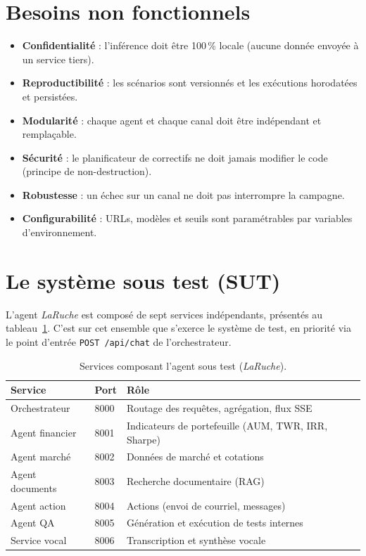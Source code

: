 \documentclass[12pt,a4paper,oneside]{report}
\newcommand{\sut}{\textit{LaRuche}}
\begin{document}
\section{Besoins non fonctionnels}
\begin{itemize}[leftmargin=*]
  \item \textbf{Confidentialité} : l'inférence doit être 100\,\% locale (aucune donnée
  envoyée à un service tiers).
  \item \textbf{Reproductibilité} : les scénarios sont versionnés et les exécutions
  horodatées et persistées.
  \item \textbf{Modularité} : chaque agent et chaque canal doit être indépendant et
  remplaçable.
  \item \textbf{Sécurité} : le planificateur de correctifs ne doit jamais modifier le
  code (principe de non-destruction).
  \item \textbf{Robustesse} : un échec sur un canal ne doit pas interrompre la
  campagne.
  \item \textbf{Configurabilité} : URLs, modèles et seuils sont paramétrables par
  variables d'environnement.
\end{itemize}

\section{Le système sous test (SUT)}
L'agent \sut{} est composé de sept services indépendants, présentés au
tableau~\ref{tab:services}. C'est sur cet ensemble que s'exerce le système de test, en
priorité via le point d'entrée \texttt{POST /api/chat} de l'orchestrateur.

\begin{table}[H]
\centering
\caption{Services composant l'agent sous test (\sut{}).}
\label{tab:services}
\renewcommand{\arraystretch}{1.3}
\begin{tabularx}{\textwidth}{@{}l l X@{}}
\toprule
\textbf{Service} & \textbf{Port} & \textbf{Rôle} \\
\midrule
Orchestrateur & 8000 & Routage des requêtes, agrégation, flux SSE \\
Agent financier & 8001 & Indicateurs de portefeuille (AUM, TWR, IRR, Sharpe) \\
Agent marché & 8002 & Données de marché et cotations \\
Agent documents & 8003 & Recherche documentaire (RAG) \\
Agent action & 8004 & Actions (envoi de courriel, messages) \\
Agent QA & 8005 & Génération et exécution de tests internes \\
Service vocal & 8006 & Transcription et synthèse vocale \\
\bottomrule
\end{tabularx}
\end{table}
\end{document}
